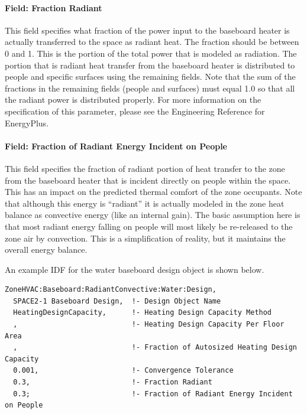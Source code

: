 \paragraph{Field: Fraction Radiant}\label{field-fraction-radiant-000}

This field specifies what fraction of the power input to the baseboard heater is actually transferred to the space as radiant heat. The fraction should be between 0 and 1. This is the portion of the total power that is modeled as radiation. The portion that is radiant heat transfer from the baseboard heater is distributed to people and specific surfaces using the remaining fields. Note that the sum of the fractions in the remaining fields (people and surfaces) must equal 1.0 so that all the radiant power is distributed properly. For more information on the specification of this parameter, please see the Engineering Reference for EnergyPlus.

\paragraph{Field: Fraction of Radiant Energy Incident on People}\label{field-fraction-of-radiant-energy-incident-on-people}

This field specifies the fraction of radiant portion of heat transfer to the zone from the baseboard heater that is incident directly on people within the space. This has an impact on the predicted thermal comfort of the zone occupants. Note that although this energy is ``radiant'' it is actually modeled in the zone heat balance as convective energy (like an internal gain). The basic assumption here is that most radiant energy falling on people will most likely be re-released to the zone air by convection. This is a simplification of reality, but it maintains the overall energy balance.

An example IDF for the water baseboard design object is shown below.

\begin{lstlisting}
ZoneHVAC:Baseboard:RadiantConvective:Water:Design,
  SPACE2-1 Baseboard Design,  !- Design Object Name
  HeatingDesignCapacity,      !- Heating Design Capacity Method
  ,                           !- Heating Design Capacity Per Floor Area
  ,                           !- Fraction of Autosized Heating Design Capacity
  0.001,                      !- Convergence Tolerance
  0.3,                        !- Fraction Radiant
  0.3;                        !- Fraction of Radiant Energy Incident on People
\end{lstlisting}

